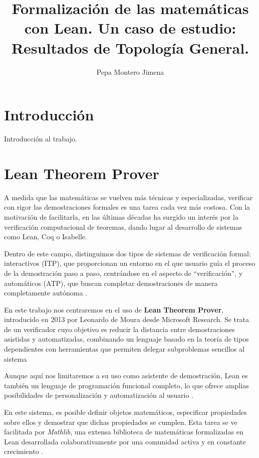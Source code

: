 \documentclass{article}
\title{Formalización de las matemáticas con Lean. Un caso de estudio: Resultados de Topología General.}
\author{Pepa Montero Jimena}
\date{}
\newcommand{\quotes}[1]{``#1''}
\begin{document}
\maketitle
\tableofcontents


\section{Introducción}

Introducción al trabajo.



\newpage

\section{Lean Theorem Prover}

A medida que las matemáticas se vuelven más técnicas y especializadas, verificar con rigor las demostraciones formales es una tarea cada vez más costosa. Con la motivación de facilitarla, en las últimas décadas ha surgido un interés por la verificación computacional de teoremas, dando lugar al desarrollo de sistemas como Lean, Coq o Isabelle.

Dentro de este campo, distinguimos dos tipos de sistemas de verificación formal: interactivos (ITP), que proporcionan un entorno en el que usuario guía el proceso de la demostración paso a paso, centrándose en el aspecto de \quotes{verificación}, y automáticos (ATP), que buscan completar demostraciones de manera completamente autónoma \cite[Sección~1]{avigad2024theorem}.

En este trabajo nos centraremos en el uso de \textbf{Lean Theorem Prover}, introducido en 2013 por Leonardo de Moura desde Microsoft Research. Se trata de un verificador cuyo objetivo es reducir la distancia entre demostraciones asistidas y automatizadas, combinando un lenguaje basado en la teoría de tipos dependientes con herramientas que permiten delegar subproblemas sencillos al sistema

Aunque aquí nos limitaremos a su uso como asistente de demostración, Lean es también un lenguaje de programación funcional completo, lo que ofrece amplias posibilidades de personalización y automatización al usuario \cite[Sección~1]{avigad2024theorem}.

En este sistema, es posible definir objetos matemáticos, especificar propiedades sobre ellos y demostrar que dichas propiedades se cumplen. Esta tarea se ve facilitada por \textit{Mathlib}, una extensa biblioteca de matemáticas formalizadas en Lean desarrollada colaborativamente por una comunidad activa y en constante crecimiento \cite{mathlib}.
\end{document}
